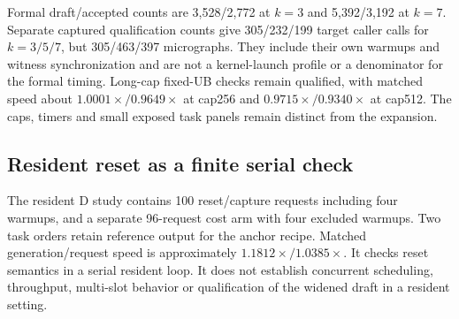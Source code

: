 

Formal draft/accepted counts are 3,528/2,772 at $k=3$ and 5,392/3,192 at $k=7$. Separate captured qualification counts give 305/232/199 target caller calls for $k=3/5/7$, but 305/463/397 micrographs. They include their own warmups and witness synchronization and are not a kernel-launch profile or a denominator for the formal timing. Long-cap fixed-UB checks remain qualified, with matched speed about $1.0001\times/0.9649\times$ at cap256 and $0.9715\times/0.9340\times$ at cap512. The caps, timers and small exposed task panels remain distinct from the expansion.

\subsection{Resident reset as a finite serial check}
\label{supp:resident_reset}
The resident D study contains 100 reset/capture requests including four warmups, and a separate 96-request cost arm with four excluded warmups. Two task orders retain reference output for the anchor recipe. Matched generation/request speed is approximately $1.1812\times/1.0385\times$. It checks reset semantics in a serial resident loop. It does not establish concurrent scheduling, throughput, multi-slot behavior or qualification of the widened draft in a resident setting.
